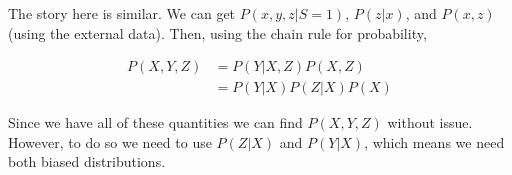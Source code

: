 \documentclass[12pt]{article}
\begin{document}
The story here is similar. We can get $P(x,y,z | S = 1)$,  $P(z | x)$, and $P(x,z)$ (using the external data). Then, using the chain rule for probability,

\begin{align*}
P(X,Y,Z) &= P(Y | X, Z) P(X,Z) \\
&= P(Y | X) P(Z | X) P(X) 
\end{align*}

Since we have all of these quantities we can find $P(X,Y,Z)$ without issue. However, to do so we need to use $P(Z | X)$ and $P(Y | X)$, which means we need both biased distributions.
\end{document}
